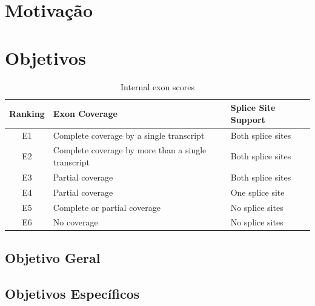 \lipsum[2]
\lipsum[2]

\section{Motivação}
\lipsum[2]
\lipsum[2]

\section{Objetivos}

\lipsum[2]
\lipsum[2]
\lipsum[2]
\lipsum[2]
\lipsum[2]
\begin{table}[h!]	
	\caption{Internal exon scores}
	\label{tab:internal}
	\centering
	\begin{tabular}{|c|l|l|}
		\hline
		Ranking & Exon Coverage & Splice Site Support\\
		\hline
		E1 & Complete coverage by a single transcript & Both splice sites\\
		E2 & Complete coverage by more than a single transcript & Both splice sites\\
		E3 & Partial coverage & Both splice sites\\
		E4 & Partial coverage & One splice site\\
		E5 & Complete or partial coverage & No splice sites\\
		E6 & No coverage & No splice sites\\
		\hline
	\end{tabular}
\end{table}

\lipsum[2]
\subsection{Objetivo Geral}
\lipsum[2]

\subsection{Objetivos Específicos}
	\lipsum[2]
	
	\begin{alineas}
		\item \lipsum[2]
		\item \lipsum[2]
		\begin{alineas}
			\item \lipsum[2]
			\item \lipsum[2]
		\end{alineas}
		\item \lipsum[2]	
	\end{alineas}
	
